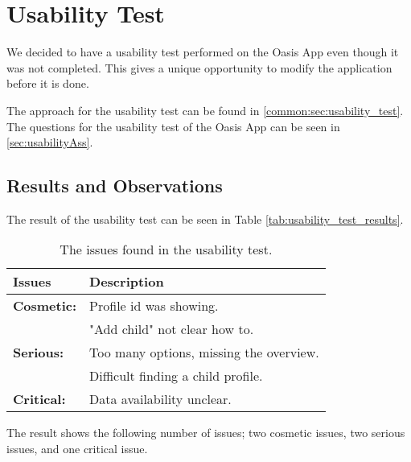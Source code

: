 \section{Usability Test}
We decided to have a usability test performed on the Oasis App even though it was not completed.
This gives a unique opportunity to modify the application before it is done.

The approach for the usability test can be found in \vref{common:sec:usability_test}.
The questions for the usability test of the Oasis App can be seen in \vref{sec:usabilityAss}.

\subsection{Results and Observations}
\label{sec:usability_results}
The result of the usability test can be seen in Table \vref{tab:usability_test_results}.

\begin{table}[H]
	\centering
		\begin{tabular}{| p{4.5cm} | m{9cm} |}
			\hline
			\textbf{Issues} 	& \textbf{Description} \\ \hline
			
			\textbf{Cosmetic:}	& Profile id was showing. \\ 
								& "Add child" not clear how to. \\ \hline
							
			\textbf{Serious:}	& Too many options, missing the overview. \\
								& Difficult finding a child profile. \\ \hline
						
			\textbf{Critical:} 	& Data availability unclear. \\ \hline
		\end{tabular}
	\caption{The issues found in the usability test.}
	\label{tab:usability_test_results}
\end{table}

The result shows the following number of issues; two cosmetic issues, two serious issues, and one critical issue.